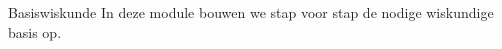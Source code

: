 
\ifdefined\HCode
\else
  \FVDmoduleopening
    {Basiswiskunde}
    {In deze module bouwen we stap voor stap de nodige wiskundige basis op.}
    {%
    }
\fi
